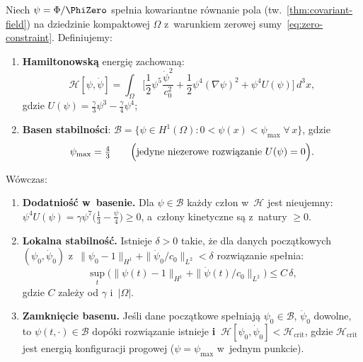 \begin{theorem}\label{thm:nonlinear-orbital}
Niech $\psi = \Phi/\PhiZero$ spe\l{}nia kowariantne r\'ownanie
pola (tw.~\ref{thm:covariant-field}) na dziedzinie kompaktowej
$\Omega$ z~warunkiem zerowej sumy~\eqref{eq:zero-constraint}.
Definiujemy:
\begin{enumerate}[nosep]
  \item[(i)] \textbf{Hamiltonowsk\k{a}} energi\k{e} zachowan\k{a}:
    \begin{equation}\label{eq:H-conserved}
      \mathcal{H}[\psi,\dot\psi] = \int_\Omega
      \biggl[\frac{1}{2}\psi^5\frac{\dot\psi^2}{c_0^2}
      + \frac{1}{2}\psi^4(\nabla\psi)^2
      + \psi^4 U(\psi)\biggr]\,d^3x,
    \end{equation}
    gdzie $U(\psi) = \frac{\gamma}{3}\psi^3 - \frac{\gamma}{4}\psi^4$;
  \item[(ii)] \textbf{Basen stabilno\'sci}:
    $\mathcal{B} = \{\psi \in H^1(\Omega) : 0 < \psi(x) < \psi_{\max}\;
    \forall\,x\}$, gdzie
    \begin{equation}\label{eq:basin-boundary}
      \psi_{\max} = \tfrac{4}{3}
      \qquad\Bigl(\text{jedyne niezerowe rozwi\k{a}zanie }U(\psi) = 0\Bigr).
    \end{equation}
\end{enumerate}
W\'owczas:
\begin{enumerate}
  \item \textbf{Dodatnio\'s\'c w~basenie.} Dla $\psi \in \mathcal{B}$
    ka\.zdy cz\l{}on w~$\mathcal{H}$ jest nieujemny:
    $\psi^4 U(\psi) = \gamma\psi^7\bigl(\tfrac{1}{3} - \tfrac{\psi}{4}\bigr)
    \ge 0$, a~cz\l{}ony kinetyczne s\k{a} z~natury $\ge 0$.
  \item \textbf{Lokalna stabilno\'s\'c.} Istnieje $\delta > 0$ takie, \.ze
    dla danych pocz\k{a}tkowych $(\psi_0, \dot\psi_0)$
    z~$\|\psi_0 - 1\|_{H^1} + \|\dot\psi_0/c_0\|_{L^2} < \delta$
    rozwi\k{a}zanie spe\l{}nia:
    \begin{equation}
      \sup_{t}\bigl(\|\psi(t) - 1\|_{H^1}
      + \|\dot\psi(t)/c_0\|_{L^2}\bigr) \le C\,\delta,
    \end{equation}
    gdzie $C$ zale\.zy od $\gamma$ i~$|\Omega|$.
  \item \textbf{Zamkni\k{e}cie basenu.} Je\'sli dane pocz\k{a}tkowe
    spe\l{}niaj\k{a} $\psi_0 \in \mathcal{B}$, $\dot\psi_0$ dowolne,
    to $\psi(t,\cdot) \in \mathcal{B}$
    dop\'oki rozwi\k{a}zanie istnieje
    \textbf{i~$\mathcal{H}[\psi_0, \dot\psi_0]
    < \mathcal{H}_{\mathrm{crit}}$},
    gdzie $\mathcal{H}_{\mathrm{crit}}$
    jest energi\k{a} konfiguracji progowej ($\psi = \psi_{\max}$
    w~jednym punkcie).
\end{enumerate}
\end{theorem}

